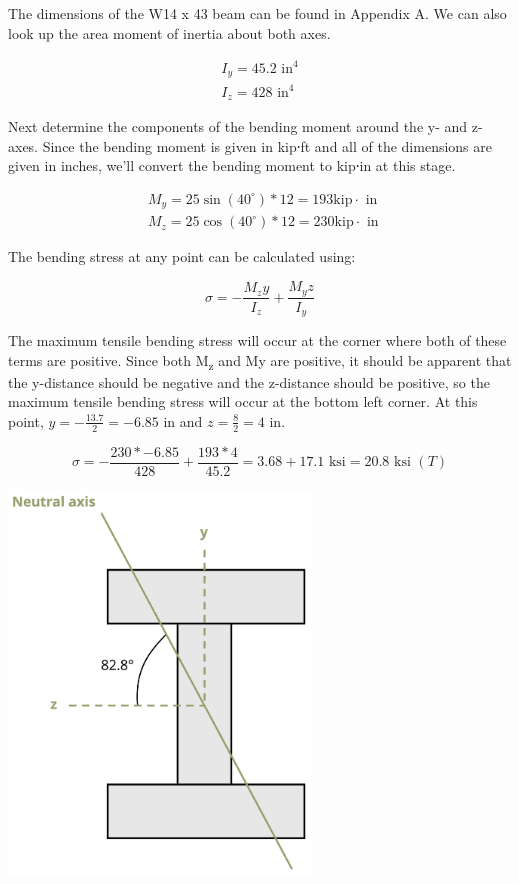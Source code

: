 \documentclass[
  letterpaper,
  DIV=11,
  numbers=noendperiod]{scrreprt}
\begin{document}
\begin{tcolorbox}
The dimensions of the W14 x 43 beam can be found in Appendix A. We can
also look up the area moment of inertia about both axes.

\[
\begin{gathered}
I_y=45.2 \text{ in}^4 \\
I_z=428 \text{ in}^4
\end{gathered}
\]

Next determine the components of the bending moment around the y- and
z-axes. Since the bending moment is given in kip⸱ft and all of the
dimensions are given in inches, we'll convert the bending moment to
kip⸱in at this stage.

\[
\begin{aligned}
& M_y=25 \sin \left(40^{\circ}\right) * 12=193 \mathrm{kip} \cdot \text { in } \\
& M_z=25 \cos \left(40^{\circ}\right) * 12=230 \mathrm{kip} \cdot \text { in }
\end{aligned}
\]

The bending stress at any point can be calculated using:

\[
\sigma=-\frac{M_z y}{I_z}+\frac{M_y z}{I_y}
\]

The maximum tensile bending stress will occur at the corner where both
of these terms are positive. Since both M\textsubscript{z} and My are
positive, it should be apparent that the y-distance should be negative
and the z-distance should be positive, so the maximum tensile bending
stress will occur at the bottom left corner. At this point,
\(y=-\frac{13.7}{2}=-6.85 \text{ in}\) and
\(z=\frac{8}{2}=4 \text{ in}\).

\[
\sigma=-\frac{230 *-6.85}{428}+\frac{193 * 4}{45.2}=3.68+17.1\text{ ksi}=20.8 \text{ ksi }(T)
\]

\begin{center}
\includegraphics[width=3.16667in,height=\textheight]{images/CH9 PNGs/Example 9.6 part 3.png}
\end{center}


\end{tcolorbox}
\end{document}
